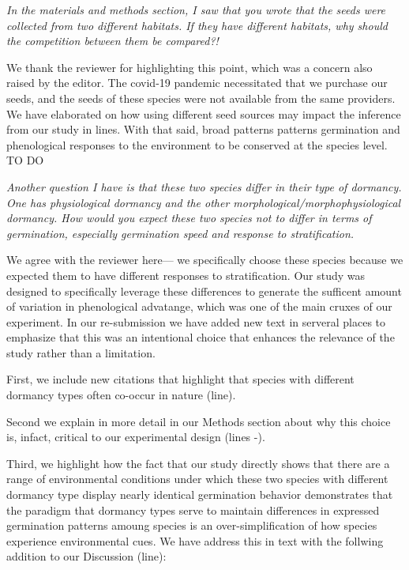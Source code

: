 \documentclass[11pt]{article}
\begin{document}
\emph{In the materials and methods section, I saw that you wrote that the seeds were collected from two different habitats. If they have different habitats, why should the competition between them be compared?!}

We thank the reviewer for highlighting this point, which was a concern also raised by the editor. The covid-19 pandemic necessitated that we purchase our seeds, and the seeds of these species were not available from the same providers. We have elaborated on how using different seed sources may impact the inference from our study in lines.  With that said, broad patterns patterns germination and phenological responses to the environment to be conserved at the species level. TO DO


\emph{Another question I have is that these two species differ in their type of dormancy. One has physiological dormancy and the other morphological/morphophysiological dormancy. How would you expect these two species not to differ in terms of germination, especially germination speed and response to stratification.}

We agree with the reviewer here--- we specifically choose these species because we expected them to have different responses to stratification. 
Our study was designed to specifically leverage these differences to generate the sufficent amount of variation in phenological advatange, which was one of the main cruxes of our experiment. In our re-submission we have added new text in serveral places to emphasize that this was an intentional choice that enhances the relevance of the study rather than a limitation.

First, we include new citations that highlight that species with different dormancy types often co-occur in nature (line).

Second we explain in more detail in our Methods section about why this choice is, infact, critical to our experimental design (lines -).

Third, we highlight how the fact that our study directly shows that there are a range of environmental conditions under which these two species with different dormancy type display nearly identical germination behavior demonstrates that the paradigm that dormancy types serve to maintain differences in expressed germination patterns amoung species is an over-simplification of how species experience environmental cues. We have address this in text with the follwing addition to our Discussion (line):
\end{document}
